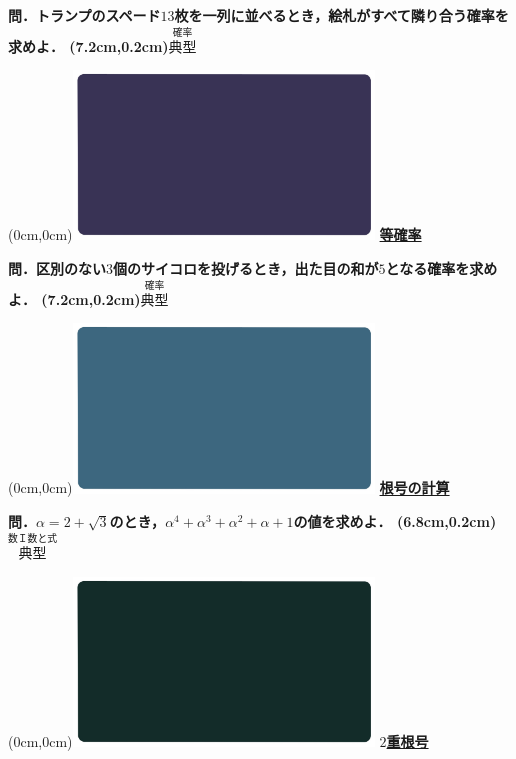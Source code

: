\documentclass[10pt,
fleqn,
dvipdfmx,
uplatex
]{jsarticle}
\begin{document}
\LARGE 
\bf\boldmath 問．トランプのスペード${13}$枚を一列に並べるとき，絵札がすべて隣り合う確率を求めよ．
\at(7.2cm,0.2cm){\small\color{bradorange}$\overset{\text{確率}}{\text{典型}}$}


\newpage



\at(0cm,0cm){\includegraphics[width=8cm,bb=0 0 1920 1080]{./youtube/thumbnails/templates/smart_background/確率.jpeg}}
{\color{orange}\bf\boldmath\huge\underline{等確率}}\vspace{0.3zw}

\LARGE 
\bf\boldmath 問．区別のない$3$個のサイコロを投げるとき，出た目の和が$5$となる確率を求めよ．
\at(7.2cm,0.2cm){\small\color{bradorange}$\overset{\text{確率}}{\text{典型}}$}


\newpage



\at(0cm,0cm){\includegraphics[width=8cm,bb=0 0 1920 1080]{./youtube/thumbnails/templates/smart_background/数I数と式.jpeg}}
{\color{orange}\bf\boldmath\huge\underline{根号の計算}}\vspace{0.3zw}

\huge 
\bf\boldmath 問．$\alpha =2+\sqrt 3$のとき，$\alpha ^4+\alpha ^3+\alpha ^2+\alpha +1$の値を求めよ．
\at(6.8cm,0.2cm){\small\color{bradorange}$\overset{\text{数Ｉ数と式}}{\text{典型}}$}


\newpage



\at(0cm,0cm){\includegraphics[width=8cm,bb=0 0 1920 1080]{./youtube/thumbnails/templates/smart_background/黒板風.jpeg}}
{\color{orange}\bf\boldmath\huge\underline{$2$重根号}}\vspace{0.3zw}
\end{document}
